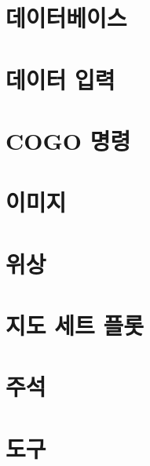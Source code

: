 \documentclass[12pt,a4paper,oneside]{book}
\begin{document}
	
\newpage
\chapter{데이터베이스}

			

\newpage
\chapter{데이터 입력}



\newpage
\chapter{	COGO 명령}


\newpage
\chapter{	이미지}


\newpage
\chapter{	위상}



\newpage
\chapter{	지도 세트 플롯}


\newpage
\chapter{	주석}



\newpage
\chapter{	도구}

	\newpage
\end{document}
